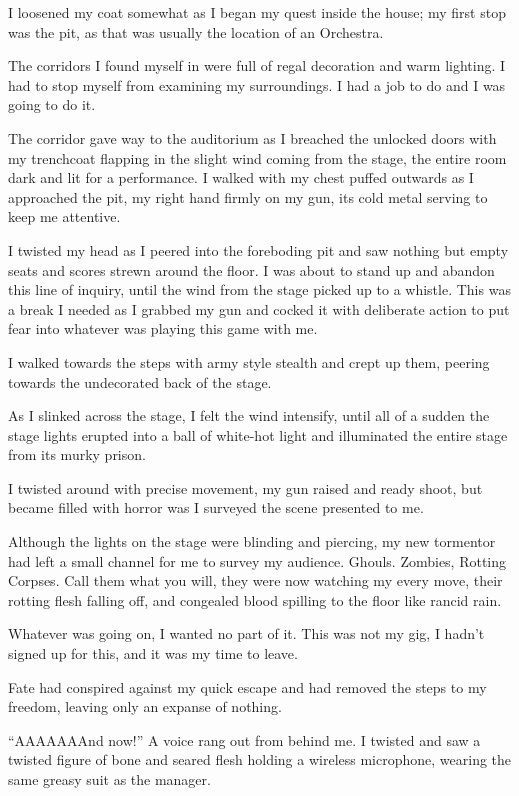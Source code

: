 I loosened my coat somewhat as I began my quest inside the house;
my first stop was the pit, as that was usually the location of an
Orchestra.

The corridors I found myself in were full of regal decoration and
warm lighting. I had to stop myself from examining my surroundings.
I had a job to do and I was going to do it.



The corridor gave way to the auditorium as I breached the unlocked
doors with my trenchcoat flapping in the slight wind coming from
the stage, the entire room dark and lit for a performance. I walked
with my chest puffed outwards as I approached the pit, my right
hand firmly on my gun, its cold metal serving to keep me
attentive.

I twisted my head as I peered into the foreboding pit and saw
nothing but empty seats and scores strewn around the floor. I was
about to stand up and abandon this line of inquiry, until the wind
from the stage picked up to a whistle. This was a break I needed as
I grabbed my gun and cocked it with deliberate action to put fear
into whatever was playing this game with me.

I walked towards the steps with army style stealth and crept up
them, peering towards the undecorated back of the stage.

As I slinked across the stage, I felt the wind intensify, until all
of a sudden the stage lights erupted into a ball of white-hot light
and illuminated the entire stage from its murky prison.

I twisted around with precise movement, my gun raised and ready
shoot, but became filled with horror was I surveyed the scene
presented to me.



Although the lights on the stage were blinding and piercing, my new
tormentor had left a small channel for me to survey my audience.
Ghouls. Zombies, Rotting Corpses. Call them what you will, they
were now watching my every move, their rotting flesh falling off,
and congealed blood spilling to the floor like rancid rain.

Whatever was going on, I wanted no part of it. This was not my gig,
I hadn't signed up for this, and it was my time to
leave.

Fate had conspired against my quick escape and had removed the
steps to my freedom, leaving only an expanse of nothing.



``AAAAAAAnd now!'' A voice rang out from behind me. I
twisted and saw a twisted figure of bone and seared flesh holding a
wireless microphone, wearing the same greasy suit as the
manager.


